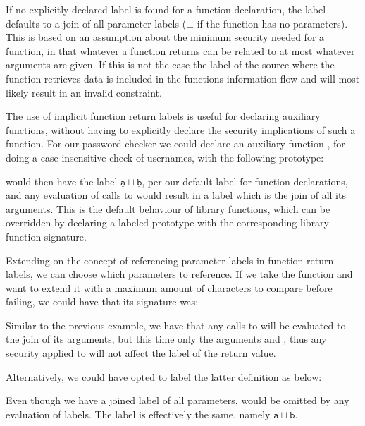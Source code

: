 If no explicitly declared label is found for a function declaration, the label defaults to a join of all parameter labels ($\bot$ if the function has no parameters).
This is based on an assumption about the minimum security needed for a function, in that whatever a function returns can be related to at most whatever arguments are given.
If this is not the case the label of the source where the function retrieves data is included in the functions information flow and will most likely result in an invalid constraint.

The use of implicit function return labels is useful for declaring auxiliary functions, without having to explicitly declare the security implications of such a function.
For our password checker we could declare an auxiliary function , for doing a case-insensitive check of usernames, with the following prototype:
\begin{center}
\end{center}
 would then have the label $\underline{\texttt{a}} \sqcup \underline{\texttt{b}}$, per our default label for function declarations, and any evaluation of calls to  would result in a label which is the join of all its arguments.
This is the default behaviour of library functions, which can be overridden by declaring a labeled prototype with the corresponding library function signature.

Extending on the concept of referencing parameter labels in function return labels, we can choose which parameters to reference.
If we take the function  and want to extend it with a maximum amount of characters to compare before failing, we could have that its signature was:
\begin{center}
\end{center}
Similar to the previous example, we have that any calls to  will be evaluated to the join of its arguments, but this time only the arguments  and , thus any security applied to  will not affect the label of the return value.

Alternatively, we could have opted to label the latter definition as below:
\begin{center}
\end{center}
Even though we have a joined label of all parameters,  would be omitted by any evaluation of labels.
The label is effectively the same, namely $\underline{\texttt{a}} \sqcup \underline{\texttt{b}}$.

